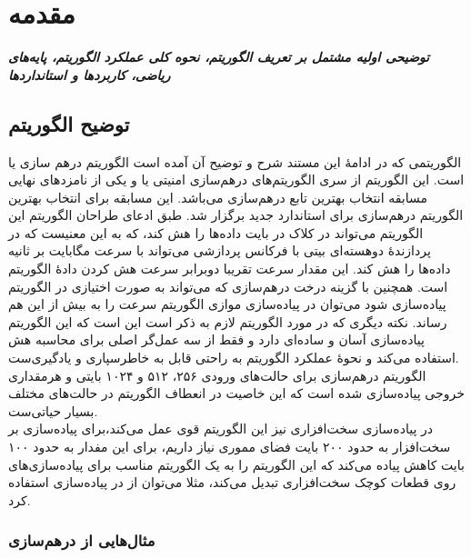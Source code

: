 \chapter{مقدمه}
\noindent
\textbf{
\textit{
توضیحی اولیه مشتمل بر تعریف الگوریتم، نحوه کلی عملکرد الگوریتم، پایه‌های ریاضی، کاربردها و استانداردها
}
}
\pagebreak
\section{توضیح الگوریتم}
الگوریتمی که در ادامهٔ این مستند شرح و توضیح آن آمده است الگوریتم درهم سازی 
یا 
است. این الگوریتم از سری الگوریتم‌های درهم‌سازی امنیتی یا 
 و یکی از نامزدهای نهایی مسابقه انتخاب بهترین تابع درهم‌سازی 
 می‌باشد. این مسابقه برای انتخاب بهترین الگوریتم در‌هم‌سازی برای استاندارد جدید 
 برگزار شد. 
 طبق ادعای طراحان الگوریتم این الگوریتم می‌تواند در 
 کلاک در بایت داده‌ها را هش کند، که به این معنیست که در پردازندهٔ دوهسته‌ای
  بیتی با فرکانس پردازشی
    می‌تواند با سرعت 
  مگابایت بر ثانیه داده‌ها را هش کند. این مقدار سرعت تقریبا دوبرابر سرعت هش کردن دادهٔ الگوریتم 
  است. همچنین با گزینه درخت درهم‌سازی که می‌تواند به صورت اختیازی در الگوریتم پیاده‌سازی شود می‌توان 	در پیاده‌سازی موازی الگوریتم سرعت را به بیش از این هم رساند. نکته دیگری که در مورد الگوریتم 
  لازم به ذکر است این است که این الگوریتم پیاده‌سازی آسان و ساده‌ای دارد و فقط از سه عمل‌گر اصلی برای محاسبه هش استفاده می‌کند و نحوهٔ عملکرد الگوریتم به راحتی قابل به خاطرسپاری و یادگیری‌ست. 
  \\
  الگوریتم درهم‌سازی
  برای حالت‌های ورودی ۲۵۶، ۵۱۲ و ۱۰۲۴ بایتی و هرمقداری خروجی پیاده‌سازی شده است که این خاصیت در انعطاف الگوریتم در حالت‌های مختلف بسیار حیاتی‌ست. 
  \\
  در پیاده‌سازی سخت‌افزاری نیز این الگوریتم قوی عمل می‌کند،‌برای پیاده‌سازی 
  بر سخت‌افزار به حدود ۲۰۰ بایت فضای مموری نیاز داریم، برای 
  این مفدار به حدود ۱۰۰ بایت کاهش پیاده می‌کند که این الگوریتم را به یک الگوریتم مناسب برای پیاده‌سازی‌های روی قطعات کوچک سخت‌افزاری تبدیل می‌کند، مثلا می‌توان از 
  در پیاده‌سازی 
  استفاده کرد.
  \cite{skein}
  
  \subsection{مثال‌هایی از درهم‌سازی}

